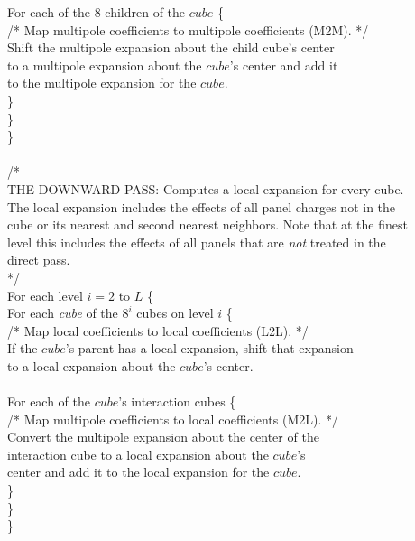 \begin{tabbing}
\> \> \> For each of the $ 8 $ children of the $ cube $ \{  \\
\> \> \> \>/* Map multipole coefficients to multipole coefficients (M2M). */\\
\> \> \> \> Shift the multipole expansion about the child cube's center\\
\> \> \> \> to a multipole expansion about the $ cube $'s center and add it\\
\> \> \> \> to the multipole expansion for the $ cube $.\\
\> \> \> \} \\
\> \> \} \\
\> \} \\
\\
\> /*\\
\> THE DOWNWARD PASS: Computes a local expansion for every cube.  \\
\> The local expansion includes the effects of all panel charges not in the\\
\> cube or its nearest and second nearest neighbors. Note that at the finest\\
\> level this includes the effects of all panels that are {\em not} treated in the \\
\> direct pass.\\
\> */\\
\>For each level $ i = 2 $ to $ L $ \{ \\
\> \>For each {\em cube} of the $ 8^i $ cubes on level $ i $ \{ \\
\> \> \>/* Map local coefficients to local coefficients (L2L). */\\
\> \> \>If the $ cube$'s parent has a local expansion, shift that expansion\\
\> \> \>to a local expansion about the $ cube $'s center.\\
\\
\> \> \>For each of the $ cube $'s interaction cubes \{ \\
\> \> \> \>/* Map multipole coefficients to local coefficients (M2L). */\\
\> \> \> \>Convert the multipole expansion about the center of the \\
\> \> \> \>interaction cube to a local expansion about the $ cube $'s\\
\> \> \> \>center and add it to the local expansion for the $ cube $.\\
\> \> \> \} \\
\> \> \} \\
\> \} \\

\end{tabbing}
